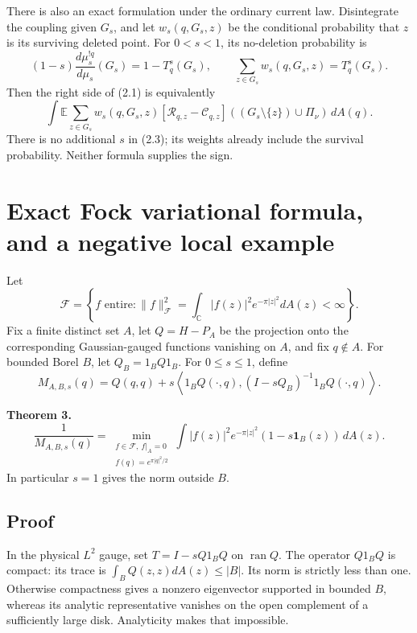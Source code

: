 \documentclass[11pt,a4paper]{article}
\theoremstyle{definition}
\theoremstyle{remark}
\numberwithin{equation}{section}
\begin{document}
There is also an exact formulation under the ordinary current law. Disintegrate the coupling given \(G_s\), and let \(w_s(q,G_s,z)\) be the conditional probability that \(z\) is its surviving deleted point. For \(0<s<1\), its no-deletion probability is \[
(1-s)\frac{d\mu_s^{!q}}{d\mu_s}(G_s)=1-T_q^s(G_s),
\qquad
\sum_{z\in G_s}w_s(q,G_s,z)=T_q^s(G_s).
\] Then the right side of (2.1) is equivalently \[
\int\mathbb E\sum_{z\in G_s}w_s(q,G_s,z)
 [\mathcal R_{q,z}-\mathcal C_{q,z}]
 ((G_s\setminus\{z\})\cup\Pi_\nu)\,dA(q).
\tag{2.3}
\] There is no additional \(s\) in (2.3); its weights already include the survival probability. Neither formula supplies the sign.

\hypertarget{exact-fock-variational-formula-and-a-negative-local-example}{%
\section{Exact Fock variational formula, and a negative local example}\label{exact-fock-variational-formula-and-a-negative-local-example}}

Let \[
\mathcal F=\left\{f\text{ entire}:
\|f\|_{\mathcal F}^2=\int_{\mathbb C}|f(z)|^2e^{-\pi|z|^2}dA(z)
<\infty\right\}.
\] Fix a finite distinct set \(A\), let \(Q=H-P_A\) be the projection onto the corresponding Gaussian-gauged functions vanishing on \(A\), and fix \(q\notin A\). For bounded Borel \(B\), let \(Q_B=1_BQ1_B\). For \(0\le s\le1\), define \[
M_{A,B,s}(q)=Q(q,q)+s\left\langle
 1_BQ(\cdot,q),(I-sQ_B)^{-1}1_BQ(\cdot,q)
\right\rangle.
\]

\textbf{Theorem 3.} \[
\boxed{\quad
\frac1{M_{A,B,s}(q)}
=\min_{\substack{f\in\mathcal F,\ f|_A=0\\
                   f(q)=e^{\pi|q|^2/2}}}
\int |f(z)|^2e^{-\pi|z|^2}
                 (1-s\mathbf1_B(z))\,dA(z).
\quad}
\tag{3.1}
\] In particular \(s=1\) gives the norm outside \(B\).

\hypertarget{proof-1}{%
\subsection{Proof}\label{proof-1}}

In the physical \(L^2\) gauge, set \(T=I-sQ1_BQ\) on \(\operatorname{ran}Q\). The operator \(Q1_BQ\) is compact: its trace is \(\int_B Q(z,z)dA(z)\le|B|\). Its norm is strictly less than one. Otherwise compactness gives a nonzero eigenvector supported in bounded \(B\), whereas its analytic representative vanishes on the open complement of a sufficiently large disk. Analyticity makes that impossible.
\end{document}
